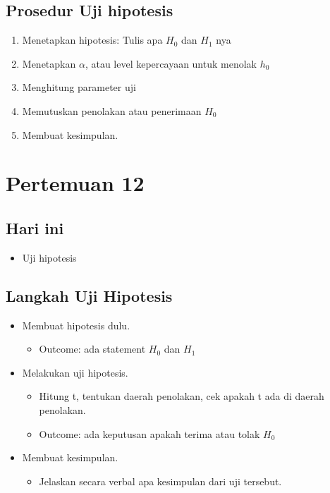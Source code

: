 \documentclass[
  letterpaper,
  DIV=11,
  numbers=noendperiod]{scrartcl}
\providecommand{\tightlist}{%
  \setlength{\itemsep}{0pt}\setlength{\parskip}{0pt}}\usepackage{longtable,booktabs,array}
\begin{document}
\subsection{Prosedur Uji hipotesis}\label{prosedur-uji-hipotesis}

\begin{enumerate}
\def\labelenumi{\arabic{enumi}.}
\tightlist
\item
  Menetapkan hipotesis: Tulis apa \(H_0\) dan \(H_1\) nya
\item
  Menetapkan \(\alpha\), atau level kepercayaan untuk menolak \(h_0\)
\item
  Menghitung parameter uji
\item
  Memutuskan penolakan atau penerimaan \(H_0\)
\item
  Membuat kesimpulan.
\end{enumerate}

\section{Pertemuan 12}\label{pertemuan-12}

\subsection{Hari ini}\label{hari-ini-2}

\begin{itemize}
\tightlist
\item
  Uji hipotesis
\end{itemize}

\subsection{Langkah Uji Hipotesis}\label{langkah-uji-hipotesis}

\begin{itemize}
\item
  Membuat hipotesis dulu.

  \begin{itemize}
  \tightlist
  \item
    Outcome: ada statement \(H_0\) dan \(H_1\)
  \end{itemize}
\item
  Melakukan uji hipotesis.

  \begin{itemize}
  \item
    Hitung t, tentukan daerah penolakan, cek apakah t ada di daerah
    penolakan.
  \item
    Outcome: ada keputusan apakah terima atau tolak \(H_0\)
  \end{itemize}
\item
  Membuat kesimpulan.

  \begin{itemize}
  \tightlist
  \item
    Jelaskan secara verbal apa kesimpulan dari uji tersebut.
  \end{itemize}
\end{itemize}
\end{document}
